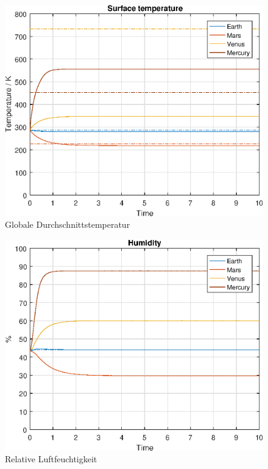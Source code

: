 \begin{refsection}
		\begin{figure}
			\center
			\includegraphics[height=0.45\textheight]{planeten/Matlab/figures/surfaceTemperature.eps}
			\caption{Globale Durchschnittstemperatur}
			\label{planeten:figSurfaceTemperature}
		\end{figure}
		
		\begin{figure}
			\center
			\includegraphics[height=0.45\textheight]{planeten/Matlab/figures/humidity.eps}
			\caption{Relative Luftfeuchtigkeit}
			\label{planeten:figHumidity}
		\end{figure}
		

\end{refsection}
